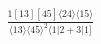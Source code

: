 \documentclass[varwidth, border=5pt]{standalone}
\begin{document}
\begin{my}
$\begin{gathered}
\scriptscriptstyle\frac{1[13][45]⟨24⟩⟨15⟩}{⟨13⟩⟨45⟩^2⟨1|2+3|1]}
\end{gathered}$
\end{my}
\end{document}
